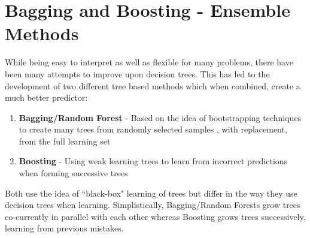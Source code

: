 \documentclass[11pt,a4paper]{report}
\begin{document}
\chapter{Bagging and Boosting - Ensemble Methods}
While being easy to interpret as well as flexible for many problems, there have been many attempts to improve upon decision trees.
This has led to the development of two different tree based methods which when combined, create a much better predictor:
\begin{enumerate}
    \item \textbf{Bagging/Random Forest} - Based on the idea of bootstrapping techniques to create many trees from randomly selected samples \cite{bootstrap}, with replacement, from the full learning set
    
    \item \textbf{Boosting} - Using weak learning trees to learn from incorrect predictions when forming successive trees
\end{enumerate}
Both use the idea of ``black-box" learning of trees but differ in the way they use decision trees when learning. 
Simplistically, Bagging/Random Forests grow trees co-currently in parallel with each other whereas Boosting grows trees successively, learning from previous mistakes. 
\end{document}
